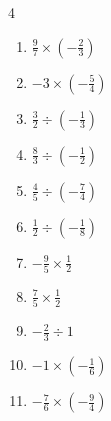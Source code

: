 \begin{multicols}{4}
\begin{enumerate}

  \item $\displaystyle \frac{9}{7}\times{}\left(-\frac{2}{3}\right)$


  \item $\displaystyle -3\times{}\left(-\frac{5}{4}\right)$


  \item $\displaystyle \frac{3}{2}\div{}\left(-\frac{1}{3}\right)$


  \item $\displaystyle \frac{8}{3}\div{}\left(-\frac{1}{2}\right)$


  \item $\displaystyle \frac{4}{5}\div{}\left(-\frac{7}{4}\right)$


  \item $\displaystyle \frac{1}{2}\div{}\left(-\frac{1}{8}\right)$

        \phantom{$\displaystyle =-4$}

  \item $\displaystyle -\frac{9}{5}\times{}\frac{1}{2}$


  \item $\displaystyle \frac{7}{5}\times{}\frac{1}{2}$


  \item $\displaystyle -\frac{2}{3}\div{}1$


\columnbreak %

  \item $\displaystyle -1\times{}\left(-\frac{1}{6}\right)$


  \item $\displaystyle -\frac{7}{6}\times{}\left(-\frac{9}{4}\right)$


\end{enumerate}
\end{multicols}
